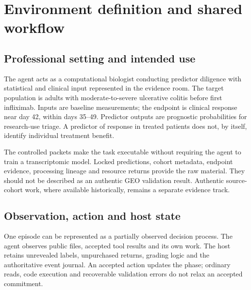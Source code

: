 \documentclass[11pt,a4paper]{article}
\begin{document}
\section{Environment definition and shared workflow}
\subsection{Professional setting and intended use}

The agent acts as a computational biologist conducting predictor diligence with statistical and clinical input represented in the evidence room. The target population is adults with moderate-to-severe ulcerative colitis before first infliximab. Inputs are baseline measurements; the endpoint is clinical response near day 42, within days 35--49. Predictor outputs are prognostic probabilities for research-use triage. A predictor of response in treated patients does not, by itself, identify individual treatment benefit.\cite{runbook,packet4}

The controlled packets make the task executable without requiring the agent to train a transcriptomic model. Locked predictions, cohort metadata, endpoint evidence, processing lineage and resource returns provide the raw material. They should not be described as an authentic GEO validation result. Authentic source-cohort work, where available historically, remains a separate evidence track.

\subsection{Observation, action and host state}

One episode can be represented as a partially observed decision process. The agent observes public files, accepted tool results and its own work. The host retains unrevealed labels, unpurchased returns, grading logic and the authoritative event journal. An accepted action updates the phase; ordinary reads, code execution and recoverable validation errors do not relax an accepted commitment.
\end{document}
